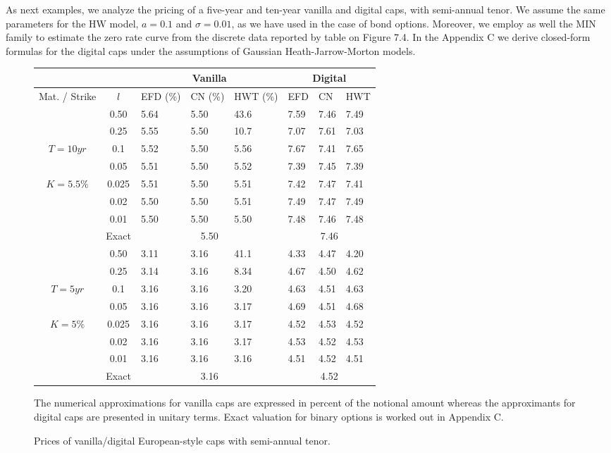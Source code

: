 As next examples, we analyze the pricing of a five-year and ten-year
vanilla and digital caps, with semi-annual tenor. We assume the same
parameters for the HW model, $a=0.1$ and $\sigma=0.01$, as we have
used in the case of bond options. Moreover, we employ as well the MIN
family to estimate the zero rate curve from the discrete data reported
by table on Figure 7.4. In the Appendix C we derive closed-form
formulas for the digital caps under the assumptions of Gaussian
Heath-Jarrow-Morton models.
\begin{figure}[h!]
\caption{Prices of vanilla/digital European-style caps with
  semi-annual tenor. \label{Caps}} 
\begin{center}
\begin{tabular}{|c|c|lll|lll|}
\hline\hline
\multicolumn{2}{|c|}{} & \multicolumn{3}{|c|}{Vanilla} &
\multicolumn{3}{|c|}{Digital} \\
\hline
Mat. / Strike & $l$ & EFD (\%) & CN (\%) & HWT (\%) & EFD & CN & HWT  \\
\hline 
& 0.50  & 5.64& 5.50& 43.6& 7.59 &7.46& 7.49 \\
& 0.25  & 5.55& 5.50& 10.7& 7.07 &7.61& 7.03 \\
$T=10yr$& 0.1   & 5.52& 5.50& 5.56& 7.67 &7.41& 7.65 \\
& 0.05  & 5.51& 5.50& 5.52& 7.39 &7.45& 7.39 \\
$K=5.5\%$& 0.025 & 5.51& 5.50& 5.51& 7.42 &7.47& 7.41 \\
& 0.02  & 5.50& 5.50& 5.51& 7.49 &7.47& 7.49 \\
& 0.01  & 5.50& 5.50& 5.50& 7.48 &7.46& 7.48 \\
\hline 
& Exact & \multicolumn{3}{|c|}{5.50} & \multicolumn{3}{|c|}{7.46} \\
\hline
& 0.50 &3.11&3.16&41.1& 4.33&4.47&4.20 \\
& 0.25 &3.14&3.16&8.34&4.67&4.50&4.62 \\
$T=5yr$& 0.1  &3.16&3.16&3.20&4.63&4.51&4.63 \\
& 0.05 &3.16&3.16&3.17&4.69&4.51&4.68 \\
$K=5\%$& 0.025&3.16&3.16&3.17&4.52&4.53&4.52 \\
& 0.02 &3.16&3.16&3.17&4.53&4.52&4.53 \\
& 0.01 &3.16&3.16&3.16&4.51&4.52&4.51 \\
\hline 
& Exact & \multicolumn{3}{|c|}{3.16} & \multicolumn{3}{|c|}{4.52} \\
\hline 
\end{tabular}
\end{center}
\begin{flushleft}
The numerical approximations for vanilla caps are expressed in percent
of the notional amount whereas the approximants for digital caps are
presented in unitary terms. Exact valuation for binary options is
worked out in Appendix C.
\end{flushleft}
\end{figure}

